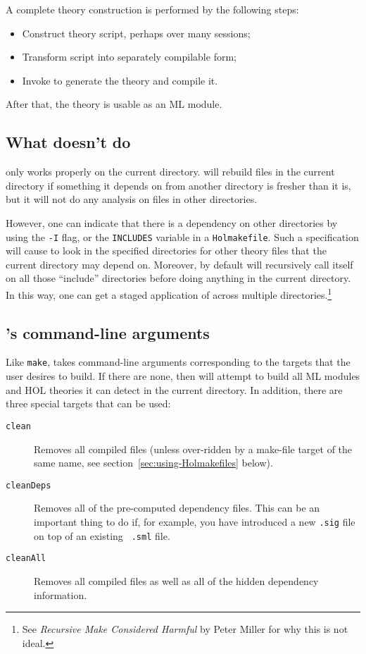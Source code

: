 A complete theory construction is performed by the following steps:
\begin{itemize}
\item Construct theory script, perhaps over many sessions;
\item Transform script into separately compilable form;
\item Invoke \holmake{} to generate the theory and compile it.
\end{itemize}

After that, the theory is usable as an ML module.

\subsection{What \holmake{} doesn't do}

\holmake{} only works properly on the current directory.  \holmake{}
will rebuild files in the current directory if something it depends on
from another directory is fresher than it is, but it will not do any
analysis on files in other directories.

However, one can indicate that there is a dependency on other
directories by using the \texttt{-I} flag, or the \texttt{INCLUDES}
variable in a \texttt{Holmakefile}.  Such a specification will cause
\holmake{} to look in the specified directories for other theory files
that the current directory may depend on.  Moreover, by default
\holmake{} will recursively call itself on all those ``include''
directories before doing anything in the current directory.  In this
way, one can get a staged application of \holmake{} across multiple
directories.\footnote{See \emph{Recursive Make Considered
    Harmful} by Peter Miller for why this is not ideal.}

\subsection{\holmake{}'s command-line arguments}

Like {\tt make}, \holmake{} takes command-line arguments corresponding
to the targets that the user desires to build.  If there are none,
then \holmake{} will attempt to build all ML modules and HOL theories
it can detect in the current directory.  In addition, there are three
special targets that can be used:
\begin{description}
\item[{\tt clean}] Removes all compiled files (unless over-ridden by a
  make-file target of the same name, see
  section~\ref{sec:using-Holmakefiles} below).
\item [{\tt cleanDeps}] Removes all of the pre-computed dependency
  files.  This can be an important thing to do if, for example, you
  have introduced a new {\tt .sig} file on top of an existing {\tt
    .sml} file.
\item [{\tt cleanAll}] Removes all compiled files as well as all of
  the hidden dependency information.
\end{description}

